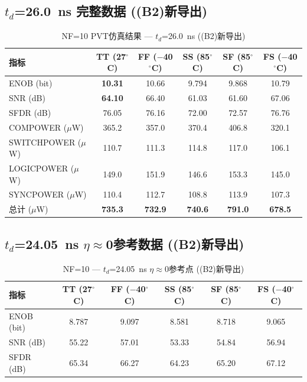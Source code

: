 \documentclass[11pt,a4paper,UTF8]{ctexart}
\newcommand{\keydata}[1]{\textbf{\color{primaryblue}#1}}
\begin{document}
\subsection{$t_d$=26.0~ns 完整数据 ((B2)新导出)}

\begin{table}[htbp]
\centering
\caption{NF=10 PVT仿真结果 --- $t_d$=26.0~ns ((B2)新导出)}
\label{tab:nf10-26-new}
\small
\setlength{\tabcolsep}{5pt}
\begin{tabular}{lccccc}
\toprule
\textbf{指标} & \textbf{TT (27$^\circ$C)} & \textbf{FF ($-$40$^\circ$C)} & \textbf{SS (85$^\circ$C)} & \textbf{SF (85$^\circ$C)} & \textbf{FS ($-$40$^\circ$C)} \\
\midrule
ENOB (bit) & \keydata{10.31} & 10.66 & 9.794 & 9.868 & 10.79 \\
SNR (dB) & \keydata{64.10} & 66.40 & 61.03 & 61.60 & 67.06 \\
SFDR (dB) & 76.05 & 76.16 & 72.00 & 72.57 & 76.76 \\
COMPOWER ($\mu$W) & 365.2 & 357.0 & 370.4 & 406.8 & 320.1 \\
SWITCHPOWER ($\mu$W) & 110.7 & 111.3 & 114.8 & 117.0 & 106.1 \\
LOGICPOWER ($\mu$W) & 149.0 & 151.9 & 146.6 & 153.3 & 145.0 \\
SYNCPOWER ($\mu$W) & 110.4 & 112.7 & 108.8 & 113.9 & 107.3 \\
\midrule
总计 ($\mu$W) & \textbf{735.3} & \textbf{732.9} & \textbf{740.6} & \textbf{791.0} & \textbf{678.5} \\
\bottomrule
\end{tabular}
\normalsize
\end{table}

\subsection{$t_d$=24.05~ns $\eta\approx$0参考数据 ((B2)新导出)}

\begin{table}[htbp]
\centering
\caption{NF=10 --- $t_d$=24.05~ns $\eta\approx$0参考点 ((B2)新导出)}
\label{tab:nf10-24-new}
\small
\setlength{\tabcolsep}{5pt}
\begin{tabular}{lccccc}
\toprule
\textbf{指标} & \textbf{TT (27$^\circ$C)} & \textbf{FF ($-$40$^\circ$C)} & \textbf{SS (85$^\circ$C)} & \textbf{SF (85$^\circ$C)} & \textbf{FS ($-$40$^\circ$C)} \\
\midrule
ENOB (bit) & 8.787 & 9.097 & 8.581 & 8.718 & 9.065 \\
SNR (dB) & 55.22 & 57.01 & 53.33 & 54.84 & 56.94 \\
SFDR (dB) & 65.34 & 66.27 & 64.23 & 65.20 & 67.12 \\
\bottomrule
\end{tabular}
\normalsize
\end{table}
\end{document}
